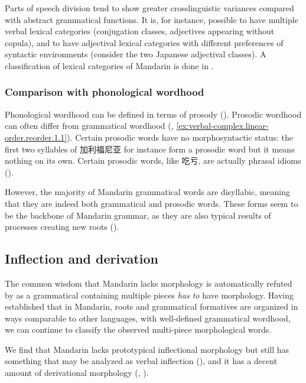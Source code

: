 \documentclass[UTF8, a4paper, oneside, scheme=plain, 12pt]{ctexrep}
\begin{document}
Parts of speech division tend to show greater crosslinguistic variances compared with abstract grammatical functions.
It is, for instance, possible to have multiple verbal lexical categories
(conjugation classes, adjectives appearing without copula),
and to have adjectival lexical categories with different preferences of syntactic environments
(consider the two Japanese adjectival classes).
A classification of lexical categories of Mandarin is done in .

\subsubsection{Comparison with phonological wordhood}\label{sec:grammatical.wordhood.phonological-word}

Phonological wordhood can be defined in terms of prosody ().
Prosodic wordhood can often differ from grammatical wordhood 
(, \ref{ex:verbal-complex.linear-order.reorder.1.1}).
Certain prosodic words have no morphosyntactic status:
the first two syllables of 加利福尼亚 for instance form a prosodic word
but it means nothing on its own.
Certain prosodic words, like 吃亏, are actually phrasal idioms
().

However, the majority of Mandarin grammatical words are disyllabic, meaning that they are indeed both grammatical and prosodic words.
These forms seem to be the backbone of Mandarin grammar,
as they are also typical results of processes creating new roots
().

\subsection{Inflection and derivation}\label{sec:grammatical.wordhood.inflection}

The common wisdom that Mandarin lacks morphology is automatically refuted
by 
as a grammatical containing multiple pieces \emph{has to} have morphology.
Having established that in Mandarin, roots and grammatical formatives are organized 
in ways comparable to other languages,
with well-defined grammatical wordhood,
we can continue to classify the observed multi-piece morphological words.

We find that Mandarin lacks prototypical inflectional morphology 
but still has something that may be analyzed as verbal inflection (),
and it has a decent amount of derivational morphology
(,
).
\end{document}
